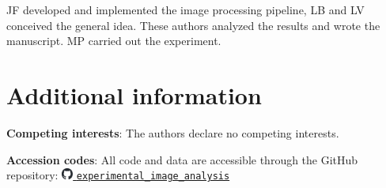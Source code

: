\documentclass[fleqn,10pt]{wlscirep}
\begin{document}
JF developed and implemented the image processing pipeline, LB and LV conceived the general idea. These authors analyzed the results and wrote the manuscript. MP carried out the experiment.

\section*{Additional information}
\textbf{Competing interests}: The authors declare no competing interests.

\noindent \textbf{Accession codes}: All code and data are accessible through the GitHub repository: \href{https://github.com/JeroFotinos/experimental_image_analysis}{\includegraphics[width=1em]{images/github-mark.pdf} \nolinkurl{experimental_image_analysis}}


%
\end{document}
